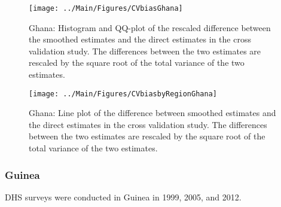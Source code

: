 \documentclass[12pt]{article}\usepackage[]{graphicx}\usepackage[]{color}
\newenvironment{knitrout}{}{} %
\begin{document}
\begin{knitrout}
\color{fgcolor}\begin{figure}[bht]

{\centering \texttt{[image: ../Main/Figures/CVbiasGhana]} 

}

\caption[Ghana]{Ghana: Histogram and QQ-plot of the rescaled difference between the smoothed estimates and the direct estimates in the cross validation study. The differences between the two estimates are rescaled by the square root of the total variance of the two estimates.}\label{fig:unnamed-chunk-149}
\end{figure}


\end{knitrout}

\begin{knitrout}
\color{fgcolor}\begin{figure}[bht]

{\centering \texttt{[image: ../Main/Figures/CVbiasbyRegionGhana]} 

}

\caption[Ghana]{Ghana: Line plot of the difference between smoothed estimates and the direct estimates in the cross validation study. The differences between the two estimates are rescaled by the square root of the total variance of the two estimates.}\label{fig:unnamed-chunk-150}
\end{figure}


\end{knitrout}


\clearpage
\subsubsection{Guinea}





DHS surveys were conducted in Guinea in 1999, 2005, and 2012.
\end{document}
